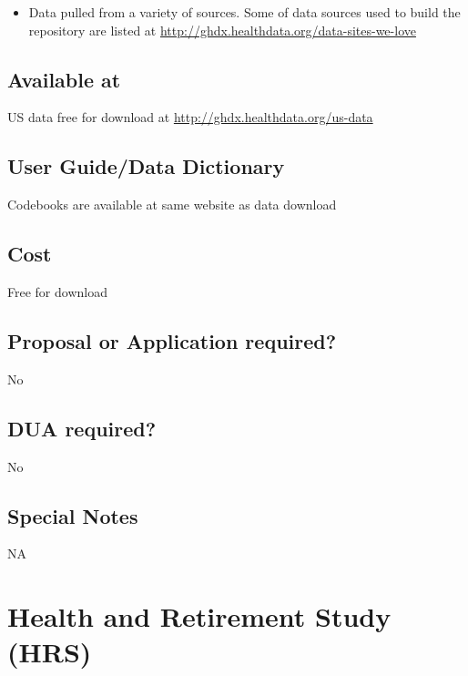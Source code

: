 \documentclass[
]{book}
\providecommand{\tightlist}{%
  \setlength{\itemsep}{0pt}\setlength{\parskip}{0pt}}
\begin{document}
\begin{itemize}
\tightlist
\item
  Data pulled from a variety of sources. Some of data sources used to build the repository are listed at \url{http://ghdx.healthdata.org/data-sites-we-love}
\end{itemize}

\hypertarget{available-at-29}{%
\section{Available at}\label{available-at-29}}

US data free for download at \url{http://ghdx.healthdata.org/us-data}

\hypertarget{user-guidedata-dictionary-29}{%
\section{User Guide/Data Dictionary}\label{user-guidedata-dictionary-29}}

Codebooks are available at same website as data download

\hypertarget{cost-29}{%
\section{Cost}\label{cost-29}}

Free for download

\hypertarget{proposal-or-application-required-29}{%
\section{Proposal or Application required?}\label{proposal-or-application-required-29}}

No

\hypertarget{dua-required-29}{%
\section{DUA required?}\label{dua-required-29}}

No

\hypertarget{special-notes-29}{%
\section{Special Notes}\label{special-notes-29}}

NA

\mainmatter

\hypertarget{health-and-retirement-study-hrs}{%
\chapter{Health and Retirement Study (HRS)}\label{health-and-retirement-study-hrs}}
\end{document}
